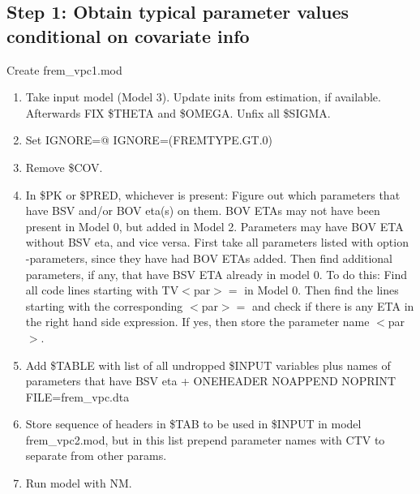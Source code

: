 \subsection{Step 1: Obtain typical parameter values conditional on covariate info}
Create frem\_vpc1.mod

\begin{enumerate}
	\item Take input model (Model 3). Update inits from estimation, if available. Afterwards FIX \$THETA and \$OMEGA. Unfix all \$SIGMA.
	\item Set IGNORE=@ IGNORE=(FREMTYPE.GT.0)
	\item Remove \$COV.
	\item In \$PK or \$PRED, whichever is present:
Figure out which parameters that have BSV and/or BOV eta(s) on them. BOV ETAs may not have been present in Model 0, but added in Model 2. 
Parameters may have BOV ETA without BSV eta, and vice versa. 
First take all parameters listed with option -parameters, since they have had BOV ETAs added. Then find additional parameters, 
if any, that have BSV ETA already in model 0.
To do this: Find all code lines starting with TV$<$par$>=$ in Model 0. Then find the lines starting with the corresponding $<$par$>=$ and
check if there is any ETA in the right hand side expression. If yes, then store the parameter name $<$par$>$.  
	\item Add \$TABLE with list of all undropped \$INPUT variables plus names of parameters that have BSV eta  + ONEHEADER NOAPPEND NOPRINT FILE=frem\_vpc.dta
	\item Store sequence of headers in \$TAB to be used in \$INPUT in model frem\_vpc2.mod, but in this list prepend parameter names with CTV to separate from other params.
	\item Run model with NM.
\end{enumerate}

